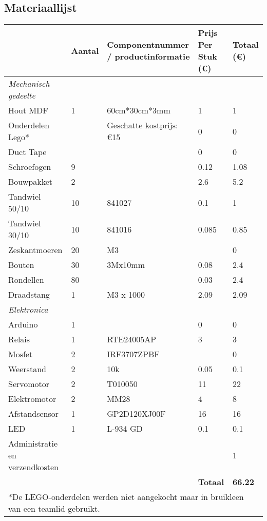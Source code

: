 \subsection{Materiaallijst}
\label{bijlage:materiaallijst}
\begin{center}
\begin{tabular}{| p{3cm} | l | p{3cm} | p{2cm} | p{2cm}|}
\hline
& \textbf{Aantal} & \textbf{Component\-nummer / product\-informatie} & \textbf{Prijs Per Stuk (\euro)} & \textbf{Totaal (\euro)}\\\hline
\emph{Mechanisch gedeelte} &  &  &  & \\\hline
Hout MDF & 1 & 60cm*30cm*3mm & 1 & 1\\\hline
Onderdelen Lego* &  & Geschatte kostprijs: \euro15 & 0 & 0\\\hline
Duct Tape &  &  & 0 & 0\\\hline
Schroefogen & 9 &  & 0.12 & 1.08\\\hline
Bouwpakket & 2 &  & 2.6 & 5.2\\\hline
Tandwiel 50/10 & 10 & 841027 & 0.1 & 1\\\hline
Tandwiel 30/10 & 10 & 841016 & 0.085 & 0.85\\\hline
Zeskantmoeren & 20 & M3 &  & 0\\\hline
Bouten & 30 & 3Mx10mm & 0.08 & 2.4\\\hline
Rondellen & 80 &  & 0.03 & 2.4\\\hline
Draadstang & 1 & M3 x 1000 & 2.09 & 2.09\\\hline
\emph{Elektronica} &  &  &  & \\\hline
Arduino & 1 &  & 0 & 0\\\hline
Relais & 1 & RTE24005AP & 3 & 3\\\hline
Mosfet & 2 & IRF3707ZPBF &  & 0\\\hline
Weerstand & 2 & 10k & 0.05 & 0.1\\\hline
Servomotor & 2 & T010050 & 11 & 22\\\hline
Elektromotor & 2 & MM28 & 4 & 8\\\hline
Afstandsensor & 1 & GP2D120XJ00F & 16 & 16\\\hline
LED & 1 & L-934 GD & 0.1 & 0.1\\\hline
Administratie en verzendkosten &  &  &  & 1\\\hline
 &  &  & \textbf{Totaal} & \textbf{66.22}\\\hline
 \multicolumn{5}{l}{*De LEGO-onderdelen werden niet aangekocht maar in bruikleen van een teamlid gebruikt.}\\
\end{tabular}
\end{center}